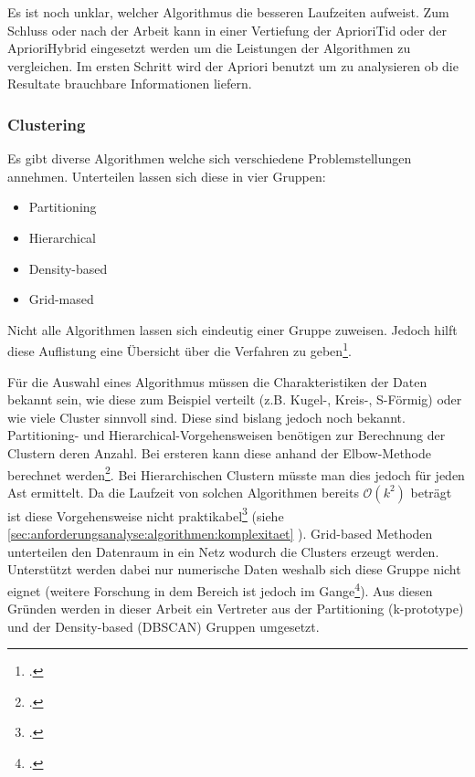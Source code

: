 Es ist noch unklar, welcher Algorithmus die besseren Laufzeiten aufweist. Zum Schluss oder nach der Arbeit kann in einer Vertiefung der AprioriTid oder der AprioriHybrid eingesetzt werden um die Leistungen der Algorithmen zu vergleichen. Im ersten Schritt wird der Apriori benutzt um zu analysieren ob die Resultate brauchbare Informationen liefern.

\subsubsection{Clustering}
\label{sec:konzept:algorithmenauswahl:clustering}
Es gibt diverse Algorithmen welche sich verschiedene Problemstellungen annehmen. Unterteilen lassen sich diese in vier Gruppen:
\begin{itemize}
	\item Partitioning
	\item Hierarchical
	\item Density-based
	\item Grid-mased
\end{itemize}
Nicht alle Algorithmen lassen sich eindeutig einer Gruppe zuweisen. Jedoch hilft diese Auflistung eine Übersicht über die Verfahren zu geben\footcite{data_mining_concepts_and_techniques}.

Für die Auswahl eines Algorithmus müssen die Charakteristiken der Daten bekannt sein, wie diese zum Beispiel verteilt (z.B. Kugel-, Kreis-, S-Förmig) oder wie viele Cluster sinnvoll sind. Diese sind bislang jedoch noch bekannt.
Partitioning- und Hierarchical-Vorgehensweisen benötigen zur Berechnung der Clustern deren Anzahl. Bei ersteren kann diese anhand der Elbow-Methode berechnet werden\footcite{elbow_method}. Bei Hierarchischen Clustern müsste man dies jedoch für jeden Ast ermittelt. Da die Laufzeit von solchen Algorithmen bereits $\mathcal{O}(k^2)$ beträgt ist diese Vorgehensweise nicht praktikabel\footcite{complexity_hierarchical_clustering} (siehe \cref{sec:anforderungsanalyse:algorithmen:komplexitaet} ). Grid-based Methoden unterteilen den Datenraum in ein Netz wodurch die Clusters erzeugt werden. Unterstützt werden dabei nur numerische Daten weshalb sich diese Gruppe nicht eignet (weitere Forschung in dem Bereich ist jedoch im Gange\footcite{sting_categorical_data}).
Aus diesen Gründen werden in dieser Arbeit ein Vertreter aus der Partitioning (k-prototype) und der Density-based (DBSCAN) Gruppen umgesetzt.


